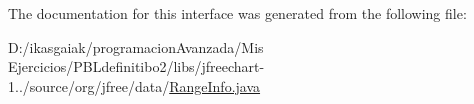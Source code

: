 The documentation for this interface was generated from the following file\+:\begin{DoxyCompactItemize}
\item 
D\+:/ikasgaiak/programacion\+Avanzada/\+Mis Ejercicios/\+P\+B\+Ldefinitibo2/libs/jfreechart-\/1../source/org/jfree/data/\mbox{\hyperlink{_range_info_8java}{Range\+Info.\+java}}\end{DoxyCompactItemize}
